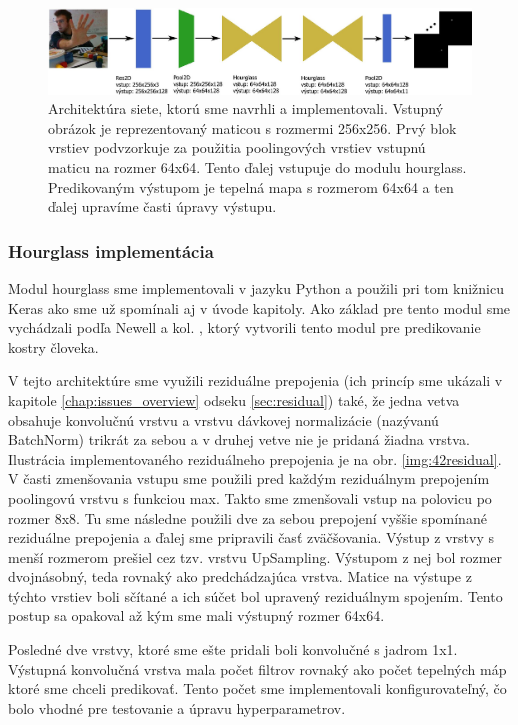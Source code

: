 \begin{figure}[H]
	\begin{center}
		\includegraphics[width=\textwidth]{images/our_architecture.jpg}
		\caption{Architektúra siete, ktorú sme navrhli a implementovali. Vstupný obrázok je reprezentovaný maticou s rozmermi 256x256. Prvý blok vrstiev podvzorkuje za použitia poolingových vrstiev vstupnú maticu na rozmer 64x64. Tento ďalej vstupuje do modulu hourglass. Predikovaným výstupom je tepelná mapa s rozmerom 64x64 a ten ďalej upravíme časti úpravy výstupu.}
		\label{img:our_architecture}
	\end{center}
\end{figure}

\subsubsection{Hourglass implementácia}
Modul hourglass sme implementovali v jazyku Python a použili pri tom knižnicu Keras ako sme už spomínali aj v úvode kapitoly. Ako základ pre tento modul sme vychádzali podľa Newell a kol. \cite{DBLP:journals/corr/NewellYD16}, ktorý vytvorili tento modul pre predikovanie kostry človeka. 

V tejto architektúre sme využili reziduálne prepojenia (ich princíp sme ukázali v kapitole \ref{chap:issues_overview} odseku \ref{sec:residual}) také, že jedna vetva obsahuje konvolučnú vrstvu a vrstvu dávkovej normalizácie (nazývanú BatchNorm) trikrát za sebou a v druhej vetve nie je pridaná žiadna vrstva. Ilustrácia implementovaného reziduálneho prepojenia je na obr. \ref{img:42residual}. V časti zmenšovania vstupu sme použili pred každým reziduálnym prepojením poolingovú vrstvu s funkciou max. Takto sme zmenšovali vstup na polovicu po rozmer 8x8. Tu sme následne použili dve za sebou prepojení vyššie spomínané reziduálne prepojenia a ďalej sme pripravili časť zväčšovania. Výstup z vrstvy s menší rozmerom prešiel cez tzv. vrstvu UpSampling. Výstupom z nej bol rozmer dvojnásobný, teda rovnaký ako predchádzajúca vrstva. Matice na výstupe z týchto vrstiev boli sčítané a ich súčet bol upravený reziduálnym spojením. Tento postup sa opakoval až kým sme mali výstupný rozmer 64x64.

Posledné dve vrstvy, ktoré sme ešte pridali boli konvolučné s jadrom 1x1. Výstupná konvolučná vrstva mala počet filtrov rovnaký ako počet tepelných máp ktoré sme chceli predikovať. Tento počet sme implementovali konfigurovateľný, čo bolo vhodné pre testovanie a úpravu hyperparametrov. 

